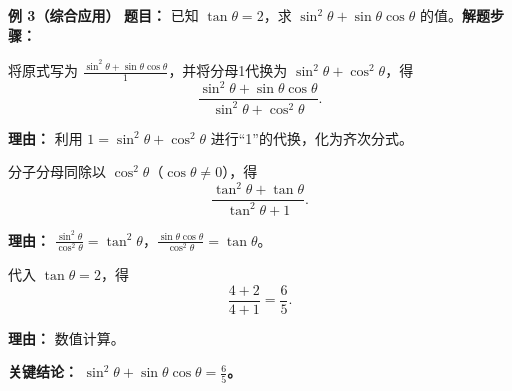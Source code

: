 \begin{examplebox}
	\medskip
	\textbf{\textcolor{CExample}{例 3（综合应用）}}
	\textbf{\textcolor{CExample}{题目：}} 已知 $\tan\theta = 2$，求 $\sin^2\theta + \sin\theta\cos\theta$ 的值。\textbf{\textcolor{CExample}{解题步骤：}}
	\begin{description}[style=nextline, leftmargin=2.8em, labelsep=0.5em, itemsep=0.45em]
		\item[\textbf{第一步（分母代换）：}]
			将原式写为 $\frac{\sin^2\theta + \sin\theta\cos\theta}{1}$，并将分母1代换为 $\sin^2\theta+\cos^2\theta$，得
			\[
				\frac{\sin^2\theta + \sin\theta\cos\theta}{\sin^2\theta+\cos^2\theta}.
			\]
			\par\textbf{理由：} 利用 $1 = \sin^2\theta + \cos^2\theta$ 进行“1”的代换，化为齐次分式。
		\item[\textbf{第二步（齐次化）：}]
			分子分母同除以 $\cos^2\theta$（$\cos\theta\neq0$），得
			\[
				\frac{\tan^2\theta + \tan\theta}{\tan^2\theta+1}.
			\]
			\par\textbf{理由：} $\frac{\sin^2\theta}{\cos^2\theta} = \tan^2\theta$，$\frac{\sin\theta\cos\theta}{\cos^2\theta} = \tan\theta$。
		\item[\textbf{第三步（代入求值）：}]
			代入 $\tan\theta = 2$，得
			\[
				\frac{4+2}{4+1} = \frac{6}{5}.
			\]
			\par\textbf{理由：} 数值计算。
	\end{description}
	\textbf{\textcolor{CExample}{关键结论：}}
	\textbf{$\sin^2\theta + \sin\theta\cos\theta = \frac{6}{5}$。}
\end{examplebox}
